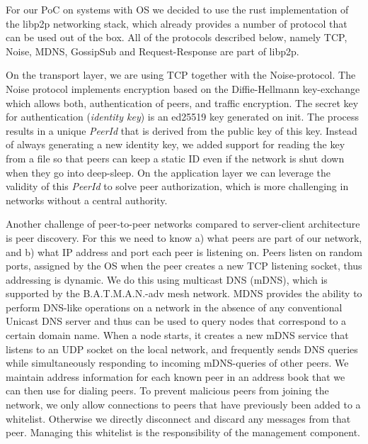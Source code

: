 \begin{figure}
    \centering
    
\end{figure}

For our PoC on systems with OS we decided to use the rust implementation of the libp2p networking stack, which already provides a number of protocol that can be used out of the box. 
All of the protocols described below, namely TCP, Noise, MDNS, GossipSub and Request-Response are part of libp2p.

On the transport layer, we are using TCP together with the Noise-protocol. 
The Noise protocol implements encryption based on the Diffie-Hellmann key-exchange which allows both, authentication of peers, and traffic encryption. 
The secret key for authentication (\textit{identity key}) is an ed25519 key generated on init.
The process results in a unique \textit{PeerId} that is derived from the public key of this key. 
Instead of always generating a new identity key, we added support for  reading the key from a file so that peers can keep a static ID even if the network is shut down when they go into deep-sleep.
On the application layer we can leverage the validity of this \textit{PeerId} to solve peer authorization, which is more challenging in networks without a central authority.

Another challenge of peer-to-peer networks compared to server-client architecture is peer discovery.
For this we need to know a) what peers are part of our network, and b) what IP address and port each peer is listening on. 
Peers listen on random ports, assigned by the OS when the peer creates a new TCP listening socket, thus addressing is dynamic. 
We do this using multicast DNS (mDNS), which is supported by the B.A.T.M.A.N.-adv mesh network.
MDNS provides the ability to perform DNS-like operations on a network in the absence of any conventional Unicast DNS server and thus can be used to query nodes that correspond to a certain domain name.
When a node starts, it creates a new mDNS service that listens to an UDP socket on the local network, and frequently sends DNS queries while simultaneously responding to incoming mDNS-queries of other peers.
We maintain address information for each known peer in an address book that we can then use for dialing peers. 
To prevent malicious peers from joining the network, we only allow connections to peers that have previously been added to a whitelist. 
Otherwise we directly disconnect and discard any messages from that peer.
Managing this whitelist is the responsibility of the management component. 

